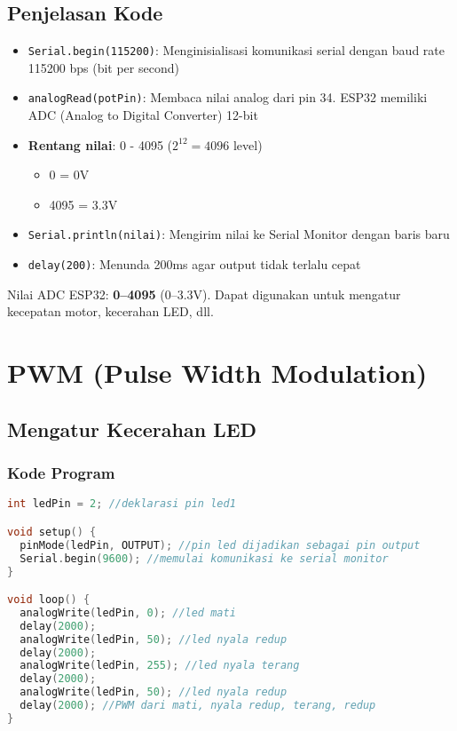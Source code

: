 \documentclass[12pt,a4paper]{article}
\begin{document}
\subsection{Penjelasan Kode}
\begin{itemize}
    \item \texttt{Serial.begin(115200)}: Menginisialisasi komunikasi serial dengan baud rate 115200 bps (bit per second)
    \item \texttt{analogRead(potPin)}: Membaca nilai analog dari pin 34. ESP32 memiliki ADC (Analog to Digital Converter) 12-bit
    \item \textbf{Rentang nilai}: 0 - 4095 ($2^{12} = 4096$ level)
    \begin{itemize}
        \item 0 = 0V
        \item 4095 = 3.3V
    \end{itemize}
    \item \texttt{Serial.println(nilai)}: Mengirim nilai ke Serial Monitor dengan baris baru
    \item \texttt{delay(200)}: Menunda 200ms agar output tidak terlalu cepat
\end{itemize}

\begin{tcolorbox}[colback=green!5!white,colframe=green!75!black,title=Catatan]
Nilai ADC ESP32: \textbf{0--4095} (0--3.3V). Dapat digunakan untuk mengatur kecepatan motor, kecerahan LED, dll.
\end{tcolorbox}

\newpage
\section{PWM (Pulse Width Modulation)}

\subsection{Mengatur Kecerahan LED}

\subsubsection{Kode Program}
\begin{lstlisting}[language=C++, caption={Kontrol Kecerahan LED dengan PWM}]
int ledPin = 2; //deklarasi pin led1

void setup() {
  pinMode(ledPin, OUTPUT); //pin led dijadikan sebagai pin output
  Serial.begin(9600); //memulai komunikasi ke serial monitor
}

void loop() {
  analogWrite(ledPin, 0); //led mati
  delay(2000);
  analogWrite(ledPin, 50); //led nyala redup
  delay(2000);
  analogWrite(ledPin, 255); //led nyala terang
  delay(2000);
  analogWrite(ledPin, 50); //led nyala redup
  delay(2000); //PWM dari mati, nyala redup, terang, redup
}
\end{lstlisting}
\end{document}
